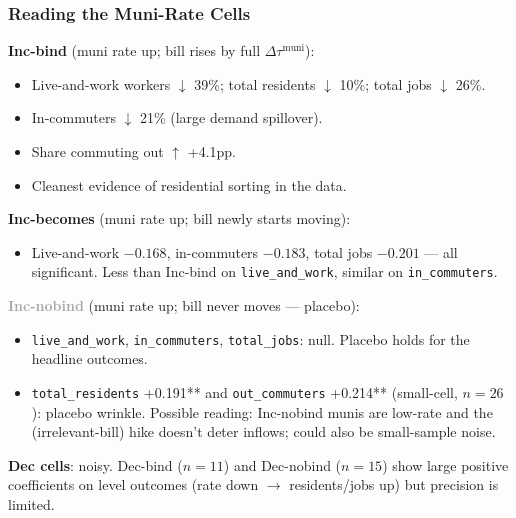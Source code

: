 \documentclass[xcolor = x11names, compress, aspectratio = 169]{beamer}
\begin{document}
    \begin{frame}
    \frametitle{Reading the Muni-Rate Cells}
        \footnotesize
        \textbf{Inc-bind} (muni rate up; bill rises by full $\Delta\tau^{\text{muni}}$):
        \begin{itemize}\setlength{\itemsep}{0.02cm}\scriptsize
            \item Live-and-work workers $\downarrow$ 39\%; total residents $\downarrow$ 10\%; total jobs $\downarrow$ 26\%.
            \item In-commuters $\downarrow$ 21\% (large demand spillover).
            \item Share commuting out $\uparrow$ +4.1pp.
            \item Cleanest evidence of residential sorting in the data.
        \end{itemize}

        \textbf{Inc-becomes} (muni rate up; bill newly starts moving):
        \begin{itemize}\setlength{\itemsep}{0.02cm}\scriptsize
            \item Live-and-work $-0.168$, in-commuters $-0.183$, total jobs $-0.201$ ---
            all significant. Less than Inc-bind on \texttt{live\_and\_work},
            similar on \texttt{in\_commuters}.
        \end{itemize}

        \textbf{\textcolor{DarkGray}{Inc-nobind}} (muni rate up; bill never moves --- placebo):
        \begin{itemize}\setlength{\itemsep}{0.02cm}\scriptsize
            \item \texttt{live\_and\_work}, \texttt{in\_commuters}, \texttt{total\_jobs}: null. Placebo holds for the headline outcomes.
            \item \texttt{total\_residents} +0.191** and \texttt{out\_commuters}
            +0.214** (small-cell, $n=26$): placebo wrinkle.
            Possible reading: Inc-nobind munis are low-rate and the (irrelevant-bill) hike doesn't deter inflows;
            could also be small-sample noise.
        \end{itemize}

        \textbf{Dec cells}: noisy. Dec-bind ($n=11$) and Dec-nobind ($n=15$) show
        large positive coefficients on level outcomes (rate down $\to$ residents/jobs up)
        but precision is limited.
    \end{frame}
\end{document}
